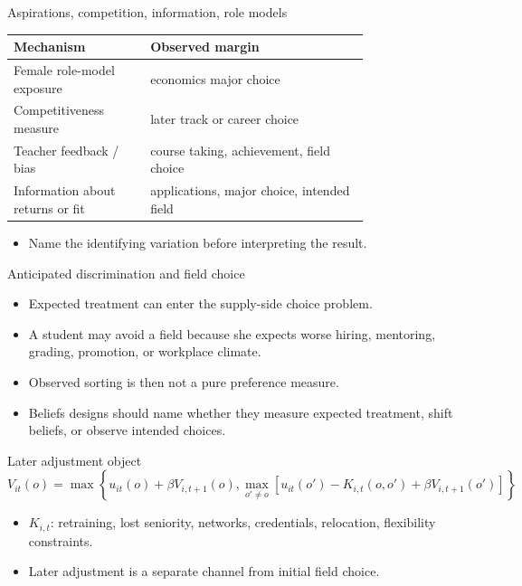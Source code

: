 \documentclass[aspectratio=169,11pt]{beamer}
\begin{document}
\begin{frame}{Aspirations, competition, information, role models}
\small
\begin{tabular}{p{0.30\linewidth} p{0.48\linewidth}}
\toprule
Mechanism & Observed margin \\
\midrule
Female role-model exposure & economics major choice \\
Competitiveness measure & later track or career choice \\
Teacher feedback / bias & course taking, achievement, field choice \\
Information about returns or fit & applications, major choice, intended field \\
\bottomrule
\end{tabular}
\vspace{0.3cm}
\begin{itemize}
    \item Name the identifying variation before interpreting the result.
\end{itemize}
\end{frame}

\begin{frame}{Anticipated discrimination and field choice}
\begin{itemize}
    \item Expected treatment can enter the supply-side choice problem.
    \item A student may avoid a field because she expects worse hiring, mentoring, grading, promotion, or workplace climate.
    \item Observed sorting is then not a pure preference measure.
    \item Beliefs designs should name whether they measure expected treatment, shift beliefs, or observe intended choices.
\end{itemize}
\end{frame}

\begin{frame}{Later adjustment object}
\[
V_{it}(o)
=
\max
\left\{
u_{it}(o)+\beta V_{i,t+1}(o),
\max_{o' \neq o}\left[u_{it}(o')-K_{i,t}(o,o')+\beta V_{i,t+1}(o')\right]
\right\}
\]
\begin{itemize}
    \item \(K_{i,t}\): retraining, lost seniority, networks, credentials, relocation, flexibility constraints.
    \item Later adjustment is a separate channel from initial field choice.
\end{itemize}
\end{frame}
\end{document}

